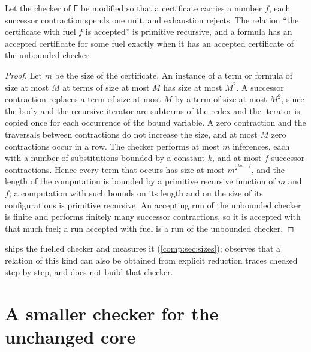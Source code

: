 \begin{proposition}[Fuel]
\label{comp:prop:fuel}
Let the checker of $\mathsf{F}$ be modified so that a certificate carries a
number $f$, each successor contraction spends one unit, and exhaustion
rejects. The relation ``the certificate with fuel $f$ is accepted'' is
primitive recursive, and a formula has an accepted certificate for some
fuel exactly when it has an accepted certificate of the unbounded checker.
\end{proposition}

\begin{proof}
Let $m$ be the size of the certificate. An instance of a term or formula of
size at most $M$ at terms of size at most $M$ has size at most $M^{2}$. A
successor contraction replaces a term of size at most $M$ by a term of size
at most $M^{2}$, since the body and the recursive iterator are subterms of
the redex and the iterator is copied once for each occurrence of the bound
variable. A zero contraction and the traversals between contractions do not
increase the size, and at most $M$ zero contractions occur in a row. The
checker performs at most $m$ inferences, each with a number of
substitutions bounded by a constant $k$, and at most $f$ successor
contractions. Hence every term that occurs has size at most
$m^{2^{km+f}}$, and the length of the computation is bounded by a primitive
recursive function of $m$ and $f$; a computation with such bounds on its
length and on the size of its configurations is primitive recursive.
An accepting run of the unbounded checker is finite and performs finitely
many successor contractions, so it is accepted with that much fuel; a run
accepted with fuel is a run of the unbounded checker.
\end{proof}

 ships the fuelled checker and measures it
(\cref{comp:sec:sizes});  observes that a relation
of this kind can also be obtained from explicit reduction traces checked
step by step, and does not build that checker.

\section{A smaller checker for the unchanged core}
\label{comp:sec:scope}

